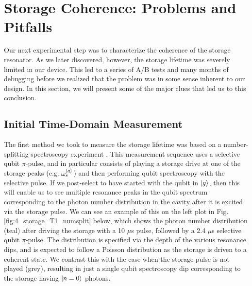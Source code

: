 \clearpage

\section{Storage Coherence: Problems and Pitfalls \label{sec:4_StorageCoherenceProblems}}

Our next experimental step was to characterize the coherence of the storage resonator. As we later discovered, however, the storage lifetime was severely limited in our device. This led to a series of A/B tests and many months of debugging before we realized that the problem was in some sense inherent to our design. In this section, we will present some of the major clues that led us to this conclusion. 

\subsection{Initial Time-Domain Measurement}

The first method we took to measure the storage lifetime was based on a number-splitting spectroscopy experiment \cite{schuster2007resolving}. This measurement sequence uses a selective qubit $\pi$-pulse, and in particular consists of playing a storage drive at one of the storage peaks (e.g. $\omega_s^{\lvert g\rangle}$) and then performing qubit spectroscopy with the selective pulse. If we post-select to have started with the qubit in $\lvert g\rangle$, then this will enable us to see multiple resonance peaks in the qubit spectrum corresponding to the photon number distribution in the cavity after it is excited via the storage pulse. We can see an example of this on the left plot in Fig. \ref{fig:4_storage_T1_numsplit} below, which shows the photon number distribution (teal) after driving the storage with a 10 $\mu$s pulse, followed by a 2.4 $\mu$s selective qubit $\pi$-pulse. The distribution is specified via the depth of the various resonance dips, and is expected to follow a Poisson distribution as the storage is driven to a coherent state. We contrast this with the case when the storage pulse is not played (grey), resulting in just a single qubit spectroscopy dip corresponding to the storage having $\lvert n=0\rangle$ photons. 

